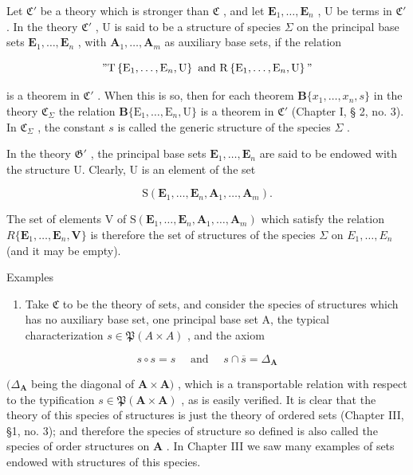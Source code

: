 Let \(\mathfrak{C}'\) be a theory which is stronger than \(\mathfrak{C}\) , and let \(\mathbf{E}_1, \ldots, \mathbf{E}_n\) , U be terms in \(\mathfrak{C}'\) . In the theory \(\mathfrak{C}'\) , U is said to be a structure of species \(\Sigma\) on the principal base sets \(\mathbf{E}_1, \ldots, \mathbf{E}_n\) , with \(\mathbf{A}_1, \ldots, \mathbf{A}_m\) as auxiliary base sets, if the relation

\[
" \mathrm{T} \left\{\mathrm{E} _ {1}, \dots , \mathrm{E} _ {n}, \mathrm{U} \right\} \text { and } \mathrm{R} \left\{\mathrm{E} _ {1}, \dots , \mathrm{E} _ {n}, \mathrm{U} \right\}"
\]

is a theorem in \(\mathfrak{C}'\) . When this is so, then for each theorem \(\mathbf{B}\{x_1, \ldots, x_n, s\}\) in the theory \(\mathfrak{C}_{\Sigma}\) the relation \(\mathbf{B}\{\mathrm{E}_1, \ldots, \mathrm{E}_n, \mathrm{U}\}\) is a theorem in \(\mathfrak{C}'\) (Chapter I, § 2, no. 3). In \(\mathfrak{C}_{\Sigma}\) , the constant \(s\) is called the generic structure of the species \(\Sigma\) .

In the theory \(\mathfrak{G}'\) , the principal base sets \(\mathbf{E}_1, \ldots, \mathbf{E}_n\) are said to be endowed with the structure U. Clearly, U is an element of the set

\[
\mathrm{S} (\mathbf {E} _ {1}, \dots , \mathbf {E} _ {n}, \mathbf {A} _ {1}, \dots , \mathbf {A} _ {m}).
\]

The set of elements V of \(\mathrm{S}(\mathbf{E}_{1},\ldots,\mathbf{E}_{n},\mathbf{A}_{1},\ldots,\mathbf{A}_{m})\) which satisfy the relation \(R\{\mathbf{E}_{1},\ldots,\mathbf{E}_{n},\mathbf{V}\}\) is therefore the set of structures of the species \(\Sigma\) on \(E_{1},\ldots,E_{n}\) (and it may be empty).

Examples

\begin{enumerate}
\def\labelenumi{(\arabic{enumi})}
\tightlist
\item
  Take \(\mathfrak{C}\) to be the theory of sets, and consider the species of structures which has no auxiliary base set, one principal base set A, the typical characterization \(s \in \mathfrak{P}(A \times A)\) , and the axiom
\end{enumerate}

\[
s \circ s = s \quad \text { and } \quad s \cap \overline{s} = \Delta_{\mathbf{A}}
\]

\((\Delta_{\mathbf{A}}\) being the diagonal of \(\mathbf{A} \times \mathbf{A})\) , which is a transportable relation with respect to the typification \(s \in \mathfrak{P}(\mathbf{A} \times \mathbf{A})\) , as is easily verified. It is clear that the theory of this species of structures is just the theory of ordered sets (Chapter III, §1, no. 3); and therefore the species of structure so defined is also called the species of order structures on \(\mathbf{A}\) . In Chapter III we saw many examples of sets endowed with structures of this species.

